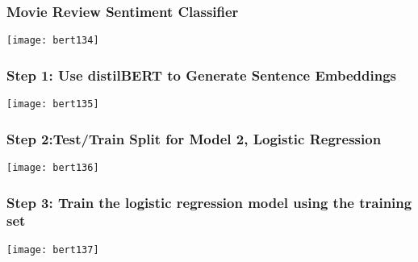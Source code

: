 \begin{frame}[fragile]\frametitle{ Movie Review Sentiment Classifier}

			\begin{center}
			\texttt{[image: bert134]}
			\end{center}	


\end{frame}

\begin{frame}[fragile]\frametitle{ Step 1: Use distilBERT to Generate Sentence Embeddings}

			\begin{center}
			\texttt{[image: bert135]}
			\end{center}	


\end{frame}

\begin{frame}[fragile]\frametitle{ Step 2:Test/Train Split for Model 2, Logistic Regression}

			\begin{center}
			\texttt{[image: bert136]}
			\end{center}	


\end{frame}

\begin{frame}[fragile]\frametitle{ Step 3: Train the logistic regression model using the training set}

			\begin{center}
			\texttt{[image: bert137]}
			\end{center}	


\end{frame}

